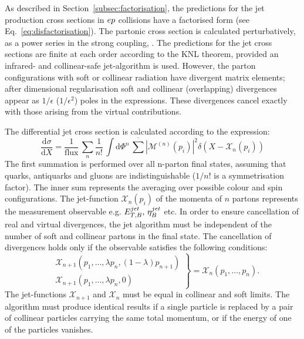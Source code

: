 As described in Section~\ref{subsec:factorisation}, the predictions for the jet production cross sections in $\mbox{$e p$}$ collisions have a factorised form (see Eq.~\eqref{eq:disfactorisation}). The partonic cross section is calculated perturbatively, as a power series in the strong coupling, \as. The predictions for the jet cross sections are finite at each order according to the KNL theorem\cite{Kinoshita:1962ur,Lee:1964is}, provided an infrared- and collinear-safe jet-algorithm is used. However, the parton configurations with soft or collinear radiation have divergent matrix elements; after dimensional regularisation soft and collinear (overlapping) divergences appear as $1/\epsilon$ ($1/\epsilon^2$) poles in the expressions. These divergences cancel exactly with those arising from the virtual contributions.

The differential jet cross section is calculated according to the expression:
\begin{equation}
\frac{\mathrm{d}\sigma}{\mathrm{d}X} = \frac{1}{\text{flux}}\, \sum_n{ \frac{1}{n!} \, \int{\mathrm{d}\Phi^{n}} \, \overline{\sum}{ \left| \mathcal{M}^{\left(n\right)}\left(p_i\right) \right|^2 } \delta\left( X - \mathcal{X}_n\left( p_i\right)\right)}
\label{eq:}
\end{equation}
The first summation is performed over all n-parton final states, assuming that quarks, antiquarks and gluons are indistinguishable ($1/n!$ is a symmetrisation factor). The inner sum represents the averaging over possible colour and spin configurations. The jet-function $\mathcal{X}_n\left( p_i\right)$ of the momenta of $n$ partons represents the measurement observable e.g. $\mbox{$E_{T,B}^{jet}$},\,\mbox{$\eta_B^{jet}$}$ etc. In order to ensure cancellation of real and virtual divergences, the jet algorithm must be independent of the number of soft and collinear partons in the final state. The cancellation of divergences holds only if the observable satisfies the following conditions:
\begin{equation}
\left.
\begin{aligned}
	&\mathcal{X}_{n+1}\left( p_1,\dots,\lambda p_n,\left(1-\lambda\right)p_{n+1}\right)\\
	&\mathcal{X}_{n+1}\left( p_1,\dots,\lambda p_n,0\right)
\end{aligned}
\right\} = \mathcal{X}_{n}\left( p_1,\dots, p_n\right).
\label{eq:}
\end{equation}
The jet-functions $\mathcal{X}_{n+1}$ and $\mathcal{X}_{n}$ must be equal in collinear and soft limits. The algorithm must produce identical results if a single particle is replaced by a pair of collinear particles carrying the same total momentum, or if the energy of one of the particles vanishes.

